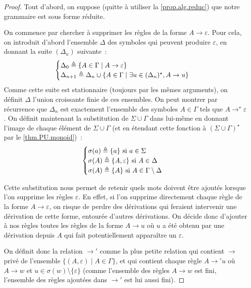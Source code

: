 \begin{proof}
  Tout d'abord, on suppose (quitte à utiliser la \cref{prop.alg.reduc}) que
  notre grammaire est sous forme réduite.

  On commence par chercher à supprimer les règles de la forme
  $A \to \varepsilon$. Pour cela, on introduit d'abord l'ensemble $\Delta$ des
  symboles qui peuvent produire $\varepsilon$, en donnant la suite
  $(\Delta_n)$ suivante~:
  \[\begin{cases}
  \Delta_0 \triangleq \{ A \in \Gamma\mid A \to \varepsilon\}\\
  \Delta_{n+1} \triangleq \Delta_n \cup \{A\in \Gamma\mid \exists u \in
  (\Delta_n)^\star, A \to u\}
  \end{cases}\]
  Comme cette suite est stationnaire (toujours par les mêmes arguments), on
  définit $\Delta$ l'union croissante finie de ces ensembles. On peut montrer
  par récurrence que $\Delta_n$ est exactement l'ensemble des symboles
  $A \in \Gamma$ tels que $A \to^\star \varepsilon$. On définit maintenant la
  substitution de $\Sigma\cup\Gamma$ dans lui-même en donnant l'image de
  chaque élément de $\Sigma\cup\Gamma$ (et en étendant cette fonction à
  $(\Sigma\cup\Gamma)^\star$ par le \cref{thm.PU.monoid})~:
  \[\begin{cases}
  \sigma(a) \triangleq \{a\} \text{ si } a \in \Sigma\\
  \sigma(A) \triangleq \{A , \varepsilon\} \text{ si } A \in \Delta\\
  \sigma(A) \triangleq \{A\} \text{ si } A \in\Gamma\setminus \Delta
  \end{cases}\]

  Cette substitution nous permet de retenir quels mots doivent être ajoutés
  lorsque l'on supprime les règles $\varepsilon$. En effet, si l'on supprime
  directement chaque règle de la forme $A \to \varepsilon$, on risque de perdre
  des dérivations qui feraient intervenir une dérivation de cette forme,
  entourée d'autres dérivations. On décide donc d'ajouter à nos règles toutes
  les règles de la forme $A \to u$ où $u$ a été obtenu par une dérivation depuis
  $A$ qui fait potentiellement apparaître un $\varepsilon$.

  On définit donc la relation $\to'$ comme la plus petite relation qui contient
  $\to$ privé de l'ensemble $\{(A,\varepsilon) \mid A \in \Gamma\}$, et qui
  contient chaque règle $A \to' u$ où $A \to w$ et
  $u \in \sigma(w)\setminus\{\varepsilon\}$ (comme l'ensemble des règles
  $A \to w$ est fini, l'ensemble des règles ajoutées dans $\to'$ est lui aussi
  fini).


\end{proof}
